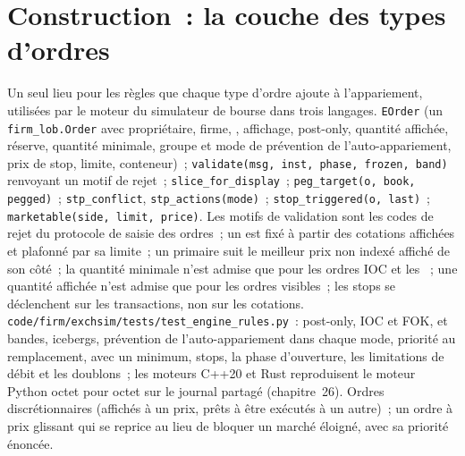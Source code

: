 \section{Construction~: la couche des types d'ordres}\label{bld:mx:order-types-and-their-uses:ordertypes}

\begin{build}
 Un seul lieu pour les règles que chaque type d'ordre ajoute à l'appariement, utilisées par le moteur du simulateur de bourse dans trois langages.
 \texttt{EOrder} (un \texttt{firm\_lob.Order} avec propriétaire, firme, , affichage, post-only, quantité affichée, réserve, quantité
minimale, groupe et mode de prévention de l'auto-appariement, prix de stop, limite, conteneur)~; \texttt{validate(msg, inst, phase, frozen, band)} renvoyant un motif
de rejet~; \texttt{slice\_for\_display}~; \texttt{peg\_target(o, book, pegged)}~; \texttt{stp\_conflict}, \texttt{stp\_actions(mode)}~;
\texttt{stop\_triggered(o, last)}~; \texttt{marketable(side, limit, price)}.
 Les motifs de validation sont les codes de rejet du protocole de saisie des ordres~; un  est fixé à partir des cotations affichées et plafonné par
sa limite~; un  primaire suit le meilleur prix non indexé affiché de son côté~; la quantité minimale n'est admise que pour les ordres IOC et les ~; une quantité
affichée n'est admise que pour les ordres visibles~; les stops se déclenchent sur les transactions, non sur les cotations.
 \texttt{code/firm/exchsim/tests/test\_engine\_rules.py}~: post-only, IOC et FOK,  et bandes, icebergs, prévention de
l'auto-appariement dans chaque mode, priorité au remplacement,  avec un minimum, stops, la phase d'ouverture, les limitations de débit et les doublons~; les moteurs C++20 et Rust
reproduisent le moteur Python octet pour octet sur le journal partagé (chapitre~26).
 Ordres discrétionnaires (affichés à un prix, prêts à être exécutés à un autre)~; un ordre à prix glissant qui se reprice au lieu de bloquer un
marché éloigné, avec sa priorité énoncée.
\end{build}

